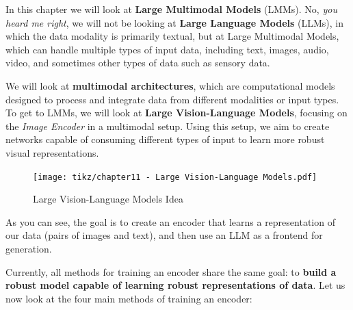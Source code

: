 In this chapter we will look at \textbf{Large Multimodal Models} (LMMs). No, \textit{you heard me right}, we will not be looking at \textbf{Large Language Models} (LLMs), in which the data modality is primarily textual, but at Large Multimodal Models, which can handle multiple types of input data, including text, images, audio, video, and sometimes other types of data such as sensory data.

We will look at \textbf{multimodal architectures}, which are computational models designed to process and integrate data from different modalities or input types. To get to LMMs, we will look at \textbf{Large Vision-Language Models}, focusing on the \textit{Image Encoder} in a multimodal setup. Using this setup, we aim to create networks capable of consuming different types of input to learn more robust visual representations.

\begin{figure}[!htbp]
    \centering
    \texttt{[image: tikz/chapter11 - Large Vision-Language Models.pdf]}
    \caption{Large Vision-Language Models Idea}
\end{figure}

As you can see, the goal is to create an encoder that learns a representation of our data (pairs of images and text), and then use an LLM as a frontend for generation.

Currently, all methods for training an encoder share the same goal: to \textbf{build a robust model capable of learning robust representations of data}. Let us now look at the four main methods of training an encoder:

